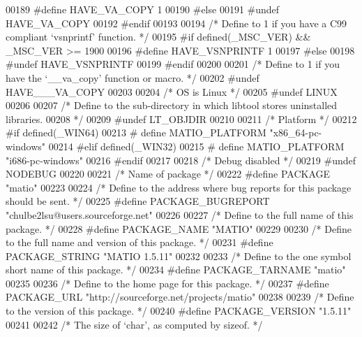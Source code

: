 \begin{DoxyCode}
00189 \textcolor{preprocessor}{#define HAVE\_VA\_COPY 1}
00190 \textcolor{preprocessor}{#else}
00191 \textcolor{preprocessor}{#undef HAVE\_VA\_COPY}
00192 \textcolor{preprocessor}{#endif}
00193 
00194 \textcolor{comment}{/* Define to 1 if you have a C99 compliant `vsnprintf' function. */}
00195 \textcolor{preprocessor}{#if defined(\_MSC\_VER) && \_MSC\_VER >= 1900}
00196 \textcolor{preprocessor}{#define HAVE\_VSNPRINTF 1}
00197 \textcolor{preprocessor}{#else}
00198 \textcolor{preprocessor}{#undef HAVE\_VSNPRINTF}
00199 \textcolor{preprocessor}{#endif}
00200 
00201 \textcolor{comment}{/* Define to 1 if you have the `\_\_va\_copy' function or macro. */}
00202 \textcolor{preprocessor}{#undef HAVE\_\_\_VA\_COPY}
00203 
00204 \textcolor{comment}{/* OS is Linux */}
00205 \textcolor{preprocessor}{#undef LINUX}
00206 
00207 \textcolor{comment}{/* Define to the sub-directory in which libtool stores uninstalled libraries.}
00208 \textcolor{comment}{   */}
00209 \textcolor{preprocessor}{#undef LT\_OBJDIR}
00210 
00211 \textcolor{comment}{/* Platform */}
00212 \textcolor{preprocessor}{#if defined(\_WIN64)}
00213 \textcolor{preprocessor}{#   define MATIO\_PLATFORM "x86\_64-pc-windows"}
00214 \textcolor{preprocessor}{#elif defined(\_WIN32)}
00215 \textcolor{preprocessor}{#   define MATIO\_PLATFORM "i686-pc-windows"}
00216 \textcolor{preprocessor}{#endif}
00217 
00218 \textcolor{comment}{/* Debug disabled */}
00219 \textcolor{preprocessor}{#undef NODEBUG}
00220 
00221 \textcolor{comment}{/* Name of package */}
00222 \textcolor{preprocessor}{#define PACKAGE "matio"}
00223 
00224 \textcolor{comment}{/* Define to the address where bug reports for this package should be sent. */}
00225 \textcolor{preprocessor}{#define PACKAGE\_BUGREPORT "chulbe2lsu@users.sourceforge.net"}
00226 
00227 \textcolor{comment}{/* Define to the full name of this package. */}
00228 \textcolor{preprocessor}{#define PACKAGE\_NAME "MATIO"}
00229 
00230 \textcolor{comment}{/* Define to the full name and version of this package. */}
00231 \textcolor{preprocessor}{#define PACKAGE\_STRING "MATIO 1.5.11"}
00232 
00233 \textcolor{comment}{/* Define to the one symbol short name of this package. */}
00234 \textcolor{preprocessor}{#define PACKAGE\_TARNAME "matio"}
00235 
00236 \textcolor{comment}{/* Define to the home page for this package. */}
00237 \textcolor{preprocessor}{#define PACKAGE\_URL "http://sourceforge.net/projects/matio"}
00238 
00239 \textcolor{comment}{/* Define to the version of this package. */}
00240 \textcolor{preprocessor}{#define PACKAGE\_VERSION "1.5.11"}
00241 
00242 \textcolor{comment}{/* The size of `char', as computed by sizeof. */}

\end{DoxyCode}
